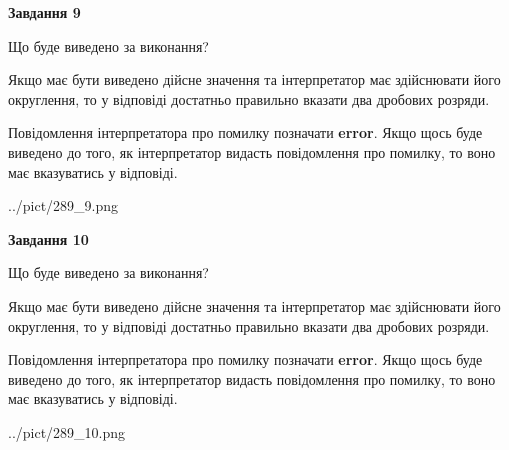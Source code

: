 \documentclass[12pt, ukrainian]{article}
\begin{document}
{\begin {Large}
{\begin {center}\textbf{Завдання 9}\end {center}}\par
Що буде виведено за виконання? \par

Якщо має бути виведено дійсне значення та інтерпретатор має здійснювати його округлення, 
то у відповіді достатньо правильно вказати два дробових розряди.

Повідомлення інтерпретатора про помилку позначати \textbf{error}.
Якщо щось буде виведено до того, як інтерпретатор видасть повідомлення про помилку, 
то воно має вказуватись у відповіді. \par

\begin{center}
	{../pict/289_9.png}
\end{center}
\newpage

{\begin {center}\textbf{Завдання 10}\end {center}}\par
Що буде виведено за виконання? \par

Якщо має бути виведено дійсне значення та інтерпретатор має здійснювати його округлення, 
то у відповіді достатньо правильно вказати два дробових розряди.

Повідомлення інтерпретатора про помилку позначати \textbf{error}.
Якщо щось буде виведено до того, як інтерпретатор видасть повідомлення про помилку, 
то воно має вказуватись у відповіді. \par

\begin{center}
	{../pict/289_10.png}
\end{center}
\newpage

\end {Large}}
\end{document}
